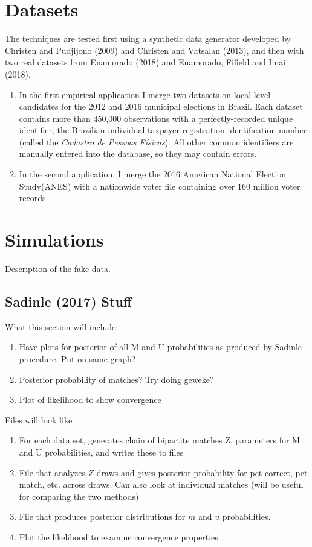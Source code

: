 \documentclass[11pt,reqno]{amsart}
\begin{document}
\section{Datasets}
The techniques are tested first using a synthetic data generator developed by Christen and Pudjijono (2009) and Christen and Vatsalan (2013), and then with two real datasets from Enamorado (2018) and Enamorado, Fifield and Imai (2018). 
\begin{enumerate}
\item In the first empirical application I merge two datasets on local-level candidates for the 2012 and 2016 municipal elections in Brazil.  Each dataset contains more than 450,000 observations with a perfectly-recorded unique identifier, the Brazilian individual taxpayer registration identification number (called the \textit{Cadastro de Pessoas F\'isicas}).  All other common identifiers are manually entered into the database, so they may contain errors.  

\item In the second application, I merge the 2016 American National Election Study(ANES) with a nationwide voter file containing over 160 million voter records.  
\end{enumerate}


\section{Simulations}
Description of the fake data.  
\subsection{Sadinle (2017) Stuff}
What this section will include:
\begin{enumerate}
\item Have plots for posterior of all M and U probabilities as produced by Sadinle procedure.  Put on same graph? 
\item Posterior probability of matches? Try doing geweke? 
\item Plot of likelihood to show convergence
\end{enumerate}

Files will look like 
\begin{enumerate}
\item For each data set, generates chain of bipartite matches Z, parameters for M and U probabilities, and writes these to files
\item File that analyzes $Z$ draws and gives posterior probability for pct correct, pct match, etc. across draws.  Can also look at individual matches (will be useful for comparing the two methods)
\item File that produces posterior distributions for $m$ and $u$ probabilities. 
\item Plot the likelihood to examine convergence properties.  
\end{enumerate}
\end{document}
